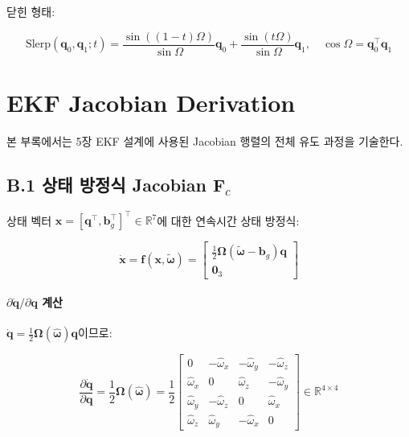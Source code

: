 닫힌 형태:
 
\begin{equation}
    \text{Slerp}(\mathbf{q}_0, \mathbf{q}_1; t) =
    \frac{\sin((1-t)\Omega)}{\sin\Omega}\mathbf{q}_0 +
    \frac{\sin(t\Omega)}{\sin\Omega}\mathbf{q}_1, \quad
    \cos\Omega = \mathbf{q}_0^\top \mathbf{q}_1
    \tag{A.13}
\end{equation}
 
\section{EKF Jacobian Derivation}
\label{app:jacobian}
 
본 부록에서는 5장 EKF 설계에 사용된 Jacobian 행렬의
전체 유도 과정을 기술한다.
 
\subsection*{B.1 상태 방정식 Jacobian $\mathbf{F}_c$}
 
상태 벡터 $\mathbf{x} = [\mathbf{q}^\top, \mathbf{b}_g^\top]^\top \in \mathbb{R}^7$에 대한
연속시간 상태 방정식:
 
\begin{equation}
    \dot{\mathbf{x}} = \mathbf{f}(\mathbf{x}, \tilde{\boldsymbol{\omega}}) =
    \begin{bmatrix}
        \frac{1}{2}\boldsymbol{\Omega}(\tilde{\boldsymbol{\omega}} - \mathbf{b}_g)\mathbf{q} \\
        \mathbf{0}_3
    \end{bmatrix}
    \tag{B.1}
\end{equation}
 
\paragraph{$\partial \dot{\mathbf{q}} / \partial \mathbf{q}$ 계산}
 
$\dot{\mathbf{q}} = \frac{1}{2}\boldsymbol{\Omega}(\hat{\boldsymbol{\omega}})\mathbf{q}$이므로:
 
\begin{equation}
    \frac{\partial \dot{\mathbf{q}}}{\partial \mathbf{q}} =
    \frac{1}{2}\boldsymbol{\Omega}(\hat{\boldsymbol{\omega}}) =
    \frac{1}{2}\begin{bmatrix}
         0       & -\hat{\omega}_x & -\hat{\omega}_y & -\hat{\omega}_z \\
         \hat{\omega}_x &  0        &  \hat{\omega}_z & -\hat{\omega}_y \\
         \hat{\omega}_y & -\hat{\omega}_z &  0        &  \hat{\omega}_x \\
         \hat{\omega}_z &  \hat{\omega}_y & -\hat{\omega}_x &  0
    \end{bmatrix}
    \in \mathbb{R}^{4\times 4}
    \tag{B.2}
\end{equation}
 
